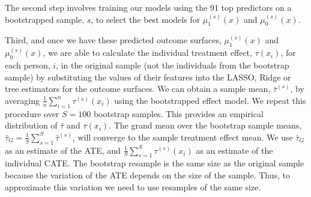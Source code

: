 \documentclass[12pt, a4paper]{article}
\begin{document}
The second step involves training our models using the 91 top predictors on a
bootstrapped sample, $s$, to select the best models for $\mu^{(s)}_1(x)$ and
$\mu^{(s)}_0(x)$. 

Third, and once we have these predicted outcome surfaces, $\mu^{(s)}_1(x)$ and
$\mu^{(s)}_0(x)$, we are able to calculate the individual treatment effect,
$\tau(x_i)$, for each person, $i$, in the original sample (not the individuals
from the bootstrap sample) by substituting the values of their features into
the LASSO, Ridge or tree estimators for the outcome surfaces. We can obtain a
sample mean, $\bar{\tau}^{(s)}$, by averaging
$\frac{1}{n}\sum^n_{i{=}1}\tau^{(s)}(x_i)$ using the bootstrapped effect model.
We repeat this procedure over $S=100$ bootstrap samples. This provides an
empirical distribution of $\bar{\tau}$ and $\tau(x_i)$. The grand mean over the
bootstrap sample means, $\bar{\tau}_G = \frac{1}{S} \sum^S_{s{=1}}
\bar{\tau}^{(s)}$, will converge to the sample treatment effect mean. We use
$\bar{\tau}_G$ as an estimate of the ATE, and $\frac{1}{S} \sum^S_{s{=}1}
\tau^{(s)}(x_i)$ as an estimate of the individual CATE. The bootstrap resample
is the same size as the original sample because the variation of the ATE
depends on the size of the sample. Thus, to approximate this variation we need
to use resamples of the same size.


\end{document}
